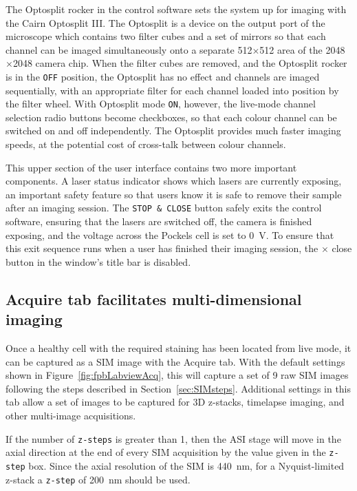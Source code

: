 The Optosplit rocker in the control software sets the system up for imaging with the Cairn Optosplit III.
The Optosplit is a device on the output port of the microscope which contains two filter cubes and a set of mirrors so that each channel can be imaged simultaneously onto a separate 512$\times$512 area of the 2048$\times$2048 camera chip.
When the filter cubes are removed, and the Optosplit rocker is in the \texttt{OFF} position, the Optosplit has no effect and channels are imaged sequentially, with an appropriate filter for each channel loaded into position by the filter wheel.
With Optosplit mode \texttt{ON}, however, the live-mode channel selection radio buttons become checkboxes, so that each colour channel can be switched on and off independently.
The Optosplit provides much faster imaging speeds, at the potential cost of cross-talk between colour channels.

This upper section of the user interface contains two more important components.
A laser status indicator shows which lasers are currently exposing, an important safety feature so that users know it is safe to remove their sample after an imaging session.
The \texttt{STOP \& CLOSE} button safely exits the control software, ensuring that the lasers are switched off, the camera is finished exposing, and the voltage across the Pockels cell is set to \SI{0}{\volt}.
To ensure that this exit sequence runs when a user has finished their imaging session, the $\times$ close button in the window's title bar is disabled.

\subsection{Acquire tab facilitates multi-dimensional imaging}
Once a healthy cell with the required staining has been located from live mode, it can be captured as a SIM image with the Acquire tab.
With the default settings shown in Figure~\ref{fig:fpbLabviewAcq}, this will capture a set of 9 raw SIM images following the steps described in Section~\ref{sec:SIMsteps}.
Additional settings in this tab allow a set of images to be captured for 3D z-stacks, timelapse imaging, and other multi-image acquisitions.

If the number of \texttt{z-steps} is greater than 1, then the ASI stage will move in the axial direction at the end of every SIM acquisition by the value given in the \texttt{z-step} box.
Since the axial resolution of the SIM is \SI{440}{\nano\meter}, for a Nyquist-limited z-stack a \texttt{z-step} of \SI{200}{\nano\meter} should be used.

